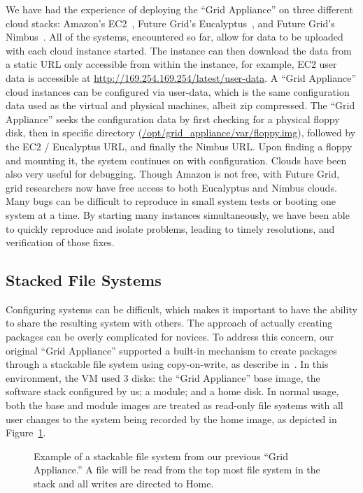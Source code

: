 \documentclass[twocolumn]{svjour3}
\begin{document}
We have had the experience of deploying the ``Grid Appliance'' on three
different cloud stacks:  Amazon's EC2~\cite{ec2}, Future Grid's
Eucalyptus~\cite{eucalyptus}, and Future Grid's Nimbus~\cite{nimbus}.  All of
the systems, encountered so far, allow for data to be uploaded with each cloud
instance started.  The instance can then download the data from a static URL
only accessible from within the instance, for example, EC2 user data is
accessible at \url{http://169.254.169.254/latest/user-data}. A ``Grid
Appliance'' cloud instances can be configured via user-data, which is the same
configuration data used as the virtual and physical machines, albeit zip
compressed.  The ``Grid Appliance'' seeks the configuration data by first
checking for a physical floppy disk, then in specific directory
(\url{/opt/grid_appliance/var/floppy.img}), followed by the EC2 / Eucalyptus
URL, and finally the Nimbus URL.  Upon finding a floppy and mounting it, the
system continues on with configuration.  Clouds have been also very useful for
debugging.  Though Amazon is not free, with Future Grid, grid researchers now
have free access to both Eucalyptus and Nimbus clouds.  Many bugs can be
difficult to reproduce in small system tests or booting one system at a time.
By starting many instances simultaneously, we have been able to quickly
reproduce and isolate problems, leading to timely resolutions, and verification
of those fixes.

\subsection{Stacked File Systems}

Configuring systems can be difficult, which makes it important to have the
ability to share the resulting system with others.  The approach of actually
creating packages can be overly complicated for novices.  To address this
concern, our original ``Grid Appliance'' supported a built-in mechanism to
create packages through a stackable file system using copy-on-write, as
describe in~\cite{vtdc}.  In this environment, the VM used 3 disks: the ``Grid
Appliance'' base image, the software stack configured by us; a module; and a
home disk.  In normal usage, both the base and module images are treated as
read-only file systems with all user changes to the system being recorded by
the home image, as depicted in Figure~\ref{fig:stackfs}.

\begin{figure}[ht]
\centering
{}
\caption{Example of a stackable file system from our previous ``Grid
Appliance.''  A file will be read from the top most file system in the stack
and all writes are directed to Home.}
\label{fig:stackfs}
\end{figure}
\end{document}
